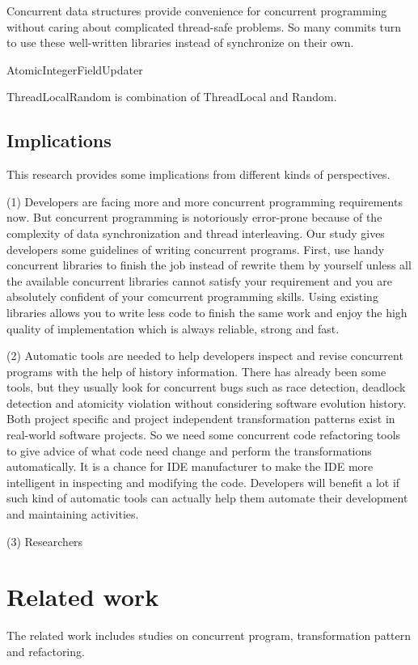 \documentclass{sig-alternate-05-2015}
\begin{document}
Concurrent data structures provide convenience for concurrent programming without caring about complicated thread-safe problems. So many commits turn to use these well-written libraries instead of synchronize on their own.

AtomicIntegerFieldUpdater 

ThreadLocalRandom is combination of ThreadLocal and Random. 

\subsection{Implications}
This research provides some implications from different kinds of perspectives.

(1) Developers are facing more and more concurrent programming requirements now. But concurrent programming is notoriously error-prone because of the complexity of data synchronization and thread interleaving. Our study gives developers some guidelines of writing concurrent programs. First, use handy concurrent libraries to finish the job instead of rewrite them by yourself unless all the available concurrent libraries cannot satisfy your requirement and you are absolutely confident of your comcurrent programming skills. Using existing libraries allows you to  write less code to finish the same work and enjoy the high quality of implementation which is always reliable, strong and fast.

(2) Automatic tools are needed to help developers inspect and revise concurrent programs with the help of history information. There has already been some tools, but they usually look for concurrent bugs such as race detection, deadlock detection and atomicity violation without considering software evolution history. Both project specific and project independent transformation patterns exist in real-world software projects. So we need some concurrent code refactoring tools to give advice of what code need change and perform the transformations automatically. It is a chance for IDE manufacturer to make the IDE more intelligent in inspecting and modifying the code. Developers will benefit a lot if such kind of automatic tools can actually help them automate their development and maintaining activities.

(3) Researchers 

\section{Related work}
The related work includes studies on concurrent program, transformation pattern and refactoring.
\end{document}
